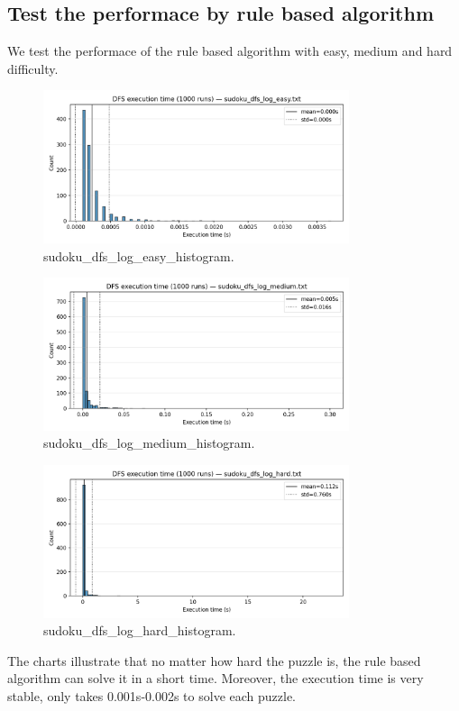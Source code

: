 \subsection{Test the performace by rule based algorithm}

We test the performace of the rule based algorithm with easy, medium and hard difficulty.

\begin{figure}[h]
\centering
\includegraphics[width=0.8\textwidth]{resources/sudoku_dfs_log_easy_histogram.png}
\caption{sudoku_dfs_log_easy_histogram.}
\label{fig:sudoku_dfs_log_easy_histogram}
\end{figure}

\begin{figure}[h]
\centering
\includegraphics[width=0.8\textwidth]{resources/sudoku_dfs_log_medium_histogram.png}
\caption{sudoku_dfs_log_medium_histogram.}
\label{fig:sudoku_dfs_log_medium_histogram}
\end{figure}

\begin{figure}[h]
\centering
\includegraphics[width=0.8\textwidth]{resources/sudoku_dfs_log_hard_histogram.png}
\caption{sudoku_dfs_log_hard_histogram.}
\label{fig:sudoku_dfs_log_hard_histogram}
\end{figure}

The charts illustrate that no matter how hard the puzzle is, the rule based algorithm can solve it in a short time. Moreover, the execution time is very stable, only takes 0.001s-0.002s to solve each puzzle.
